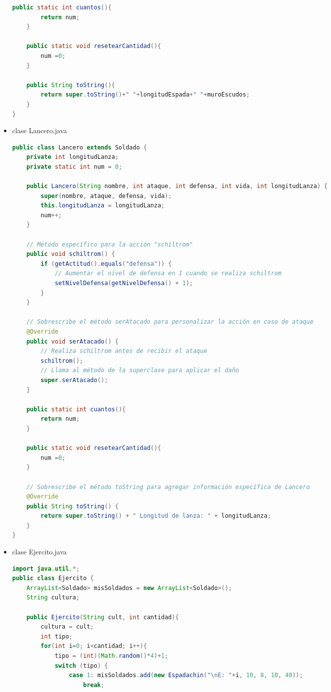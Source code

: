 \documentclass{article}
\begin{document}
\begin{itemize}
\begin{lstlisting}[language=java]
    public static int cuantos(){
        return num;
    }

    public static void resetearCantidad(){
        num =0;
    }

    public String toString(){
        return super.toString()+" "+longitudEspada+" "+muroEscudos;
    }
}
        \end{lstlisting}

        \item clase Lancero.java
        \begin{lstlisting}[language=java]
public class Lancero extends Soldado {
    private int longitudLanza;
    private static int num = 0;

    public Lancero(String nombre, int ataque, int defensa, int vida, int longitudLanza) {
        super(nombre, ataque, defensa, vida);
        this.longitudLanza = longitudLanza;
        num++;
    }

    // Método específico para la acción "schiltrom"
    public void schiltrom() {
        if (getActitud().equals("defensa")) {
            // Aumentar el nivel de defensa en 1 cuando se realiza schiltrom
            setNivelDefensa(getNivelDefensa() + 1);
        }
    }

    // Sobrescribe el método serAtacado para personalizar la acción en caso de ataque
    @Override
    public void serAtacado() {
        // Realiza schiltrom antes de recibir el ataque
        schiltrom();
        // Llama al método de la superclase para aplicar el daño
        super.serAtacado();
    }

    public static int cuantos(){
        return num;
    }

    public static void resetearCantidad(){
        num =0;
    }

    // Sobrescribe el método toString para agregar información específica de Lancero
    @Override
    public String toString() {
        return super.toString() + " Longitud de lanza: " + longitudLanza;
    }
}
        \end{lstlisting}

        \item clase Ejercito.java
        \begin{lstlisting}[language=java]
import java.util.*;
public class Ejercito {
    ArrayList<Soldado> misSoldados = new ArrayList<Soldado>();
    String cultura;

    public Ejercito(String cult, int cantidad){
        cultura = cult;
        int tipo;
        for(int i=0; i<cantidad; i++){
            tipo = (int)(Math.random()*4)+1;
            switch (tipo) {
                case 1: misSoldados.add(new Espadachin("\nE: "+i, 10, 8, 10, 40));
                    break;
            

\end{lstlisting}
\end{itemize}
\end{document}

